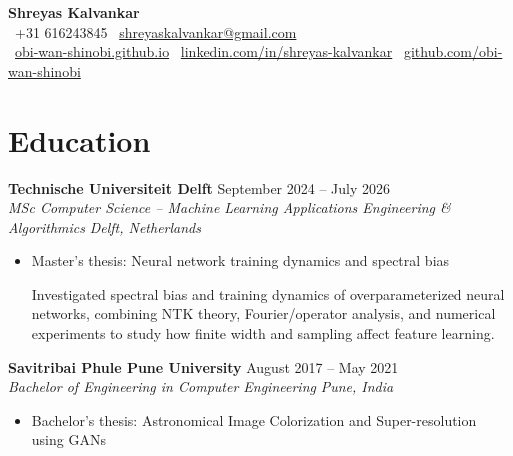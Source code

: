\documentclass[10pt,a4paper]{article}
\newcommand{\resumeheading}[4]{%
  \textbf{#1} \hfill #2\\[-0.15em]
  \textit{#3} \hfill \textit{#4}\\[-1.5em]
}
\begin{document}
\begin{center}
	{\LARGE \textbf{Shreyas Kalvankar}}\\[0.3em]
	\faPhone~+31 616243845
	\quad \textbar \quad
	\faEnvelope~\href{mailto:shreyaskalvankar@gmail.com}{shreyaskalvankar@gmail.com}\\[0.25em]

	\faGlobe~\href{https://obi-wan-shinobi.github.io}{obi-wan-shinobi.github.io}
	\quad \textbar \quad
	\faLinkedin~\href{https://linkedin.com/in/shreyas-kalvankar}{linkedin.com/in/shreyas-kalvankar}
	\quad \textbar \quad
	\faGithub~\href{https://github.com/obi-wan-shinobi}{github.com/obi-wan-shinobi}
\end{center}

\section*{Education}

\resumeheading{Technische Universiteit Delft}{September 2024 -- July 2026}{MSc Computer Science -- Machine Learning Applications Engineering \& Algorithmics}{Delft, Netherlands}
\begin{itemize}
	\item Master’s thesis: Neural network training dynamics and spectral bias

	      Investigated spectral bias and training dynamics of overparameterized neural networks, combining NTK theory, Fourier/operator analysis, and numerical experiments to study how finite width and sampling affect feature learning.
\end{itemize}

\resumeheading{Savitribai Phule Pune University}{August 2017 -- May 2021}{Bachelor of Engineering in Computer Engineering}{Pune, India}
\begin{itemize}
	\item Bachelor's thesis: Astronomical Image Colorization and Super-resolution using GANs
\end{itemize}
\end{document}
